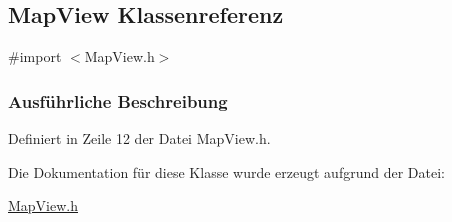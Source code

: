 \hypertarget{interface_map_view}{
\subsection{MapView Klassenreferenz}
\label{interface_map_view}
}


{\ttfamily \#import $<$MapView.h$>$}

\subsubsection{Ausführliche Beschreibung}


Definiert in Zeile 12 der Datei MapView.h.

Die Dokumentation für diese Klasse wurde erzeugt aufgrund der Datei:\begin{DoxyCompactItemize}
\item 
\hyperlink{_map_view_8h}{MapView.h}\end{DoxyCompactItemize}
